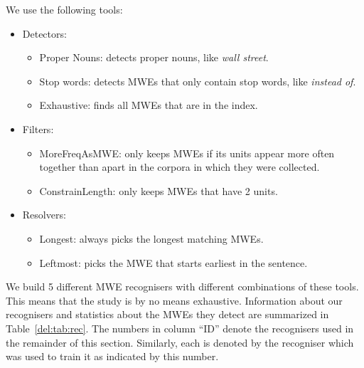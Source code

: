 \documentclass[output=paper]{langsci/langscibook}
\begin{document}
We use the following tools:
\begin{itemize}
    \item Detectors:
        \begin{itemize}
            \item Proper Nouns: detects proper nouns, like \textit{wall street}.
            \item Stop words: detects MWEs that only contain stop words, like \textit{instead of}.
            \item Exhaustive: finds all MWEs that are in the index.
        \end{itemize}
    \item Filters:
        \begin{itemize}
            \item MoreFreqAsMWE: only keeps MWEs if its units appear more often together than apart in the corpora in which they were collected.
            \item ConstrainLength: only keeps MWEs that have 2 units.
        \end{itemize}
    \item Resolvers:
        \begin{itemize}
            \item Longest: always picks the longest matching MWEs.
            \item Leftmost: picks the MWE that starts earliest in the sentence.
        \end{itemize}
\end{itemize}

We build 5 different MWE recognisers with different combinations of these tools. This means that the study is by no means exhaustive. Information about our recognisers and statistics about the MWEs they detect are summarized in Table~\ref{del:tab:rec}. The numbers in column ``ID'' denote the recognisers used in the remainder of this section. Similarly, each {\modelB} is denoted by the recogniser which was used to train it as indicated by this number.\\
\end{document}
